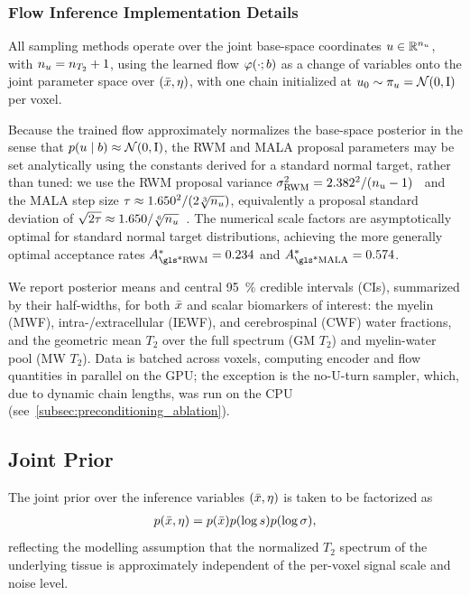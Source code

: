 \subsubsection{Flow Inference Implementation Details}\label{subsubsec:inference_details}

All sampling methods operate over the joint base-space coordinates $u \in \mathbb{R}^{n_{u}}$, with $n_{u}=n_{T_2}+1$, using the learned flow $\varphi(\cdot; b)$ as a change of variables onto the joint parameter space over $(\bar{x}, \eta)$, with one chain initialized at $u_0 \sim \pi_{u} = \mathcal{N}(\mathrm{0}, \mathrm{I})$ per voxel.

Because the trained flow approximately normalizes the base-space posterior in the sense that $p(u \mid b) \approx \mathcal{N}(\mathrm{0}, \mathrm{I})$, the \gls*{RWM} and \gls*{MALA} proposal parameters may be set analytically using the constants derived for a standard normal target, rather than tuned:
we use the \gls*{RWM} proposal variance $\sigma_{\mathrm{RWM}}^2 = 2.382^2 / (n_{u} - 1)$~\citep{roberts_weak_1997} and the \gls*{MALA} step size $\tau \approx 1.650^2 / (2\sqrt[3]{n_{u}})$, equivalently a proposal standard deviation of $\sqrt{2\tau} \approx 1.650 / \sqrt[6]{n_{u}}$~\citep{roberts_optimal_1998}.
The numerical scale factors are asymptotically optimal for standard normal target distributions, achieving the more generally optimal acceptance rates $A_{\text{\gls*{RWM}}}^* = 0.234$ and $A_{\text{\gls*{MALA}}}^* = 0.574$.

We report posterior means and central \SI{95}{\percent} credible intervals (\gls*{CI}s), summarized by their half-widths, for both $\bar{x}$ and scalar biomarkers of interest:
the myelin (\gls*{MWF}), intra-/extracellular (\gls*{IEWF}), and cerebrospinal (\gls*{CWF}) water fractions, and the geometric mean $T_2$ over the full spectrum (GM $T_2$) and myelin-water pool (MW $T_2$).
Data is batched across voxels, computing encoder and flow quantities in parallel on the \gls*{GPU};
the exception is the no-U-turn sampler, which, due to dynamic chain lengths, was run on the \gls*{CPU} (see~\cref{subsec:preconditioning_ablation}).

\subsection{Joint Prior}\label{subsec:joint_prior}

The joint prior over the inference variables $(\bar{x}, \eta)$ is taken to be factorized as
\begin{align}\label{eqn:joint_prior_factorization}
    p(\bar{x}, \eta) = p(\bar{x}) p(\log s) p(\log \sigma),
\end{align}
reflecting the modelling assumption that the normalized $T_2$ spectrum of the underlying tissue is approximately independent of the per-voxel signal scale and noise level.

